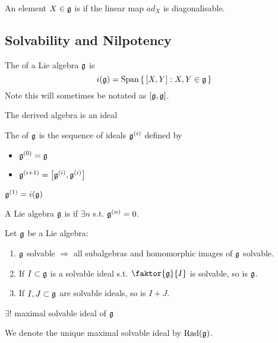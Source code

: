 \documentclass{article}
\begin{document}
\begin{definition}[ad-diagonalisable]
	An element $X\in\mf{g}$ is  if the linear map $ad_X$ is diagonalisable. 
\end{definition}


\subsection{Solvability and Nilpotency}

\begin{definition}
	The  of a Lie algebra $\mf{g}$ is 
	\[
	i(\mf{g})=\spn\set{\comm[X]{Y} : X,Y\in\mf{g}}
	\]
	Note this will sometimes be notated as $\comm[\mf{g}]{\mf{g}}$. 
\end{definition}

\begin{prop}
	The derived algebra is an ideal
\end{prop}

\begin{definition}
	The  of $\mf{g}$ is the sequence of ideals $\mf{g}^{(i)}$ defined by 
	\begin{itemize}
		\item $\mf{g}^{(0)} = \mf{g}$
		\item $\mf{g}^{(i+1)} = \comm[\mf{g}^{(i)}]{\mf{g}^{(i)}}$
	\end{itemize} 
\end{definition}

\begin{remark}
	$\mf{g}^{(1)} = i(\mf{g})$
\end{remark}

\begin{definition}
	A Lie algebra $\mf{g}$ is  if $\exists n$ s.t. $\mf{g}^{(n)}=0$. 
\end{definition}

\begin{prop}
	Let $\mf{g}$ be a Lie algebra:
	\begin{enumerate}
		\item $\mf{g}$ solvable $\Rightarrow$ all subalgebras and homomorphic images of $\mf{g}$ solvable.
		\item If $I \subset \mf{g}$ is a solvable ideal s.t. $\faktor{\mf{g}}{I}$ is solvable, so is $\mf{g}$. 
		\item If $I,J \subset \mf{g}$ are solvable ideals, so is $I+J$. 
	\end{enumerate}
\end{prop}
\begin{corollary}
	$\exists ! $ maximal solvable ideal of $\mf{g}$
\end{corollary}
\begin{definition}
	We denote the unique maximal solvable ideal by $\Rad(\mf{g})$. 
\end{definition}
\end{document}
